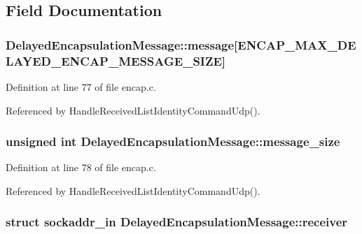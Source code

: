\subsection{\-Field \-Documentation}
\hypertarget{structDelayedEncapsulationMessage_a8a7d84611a4b658a8c27919330bb4883}{
\subsubsection[{message}]{ {\bf \-Delayed\-Encapsulation\-Message\-::message}\mbox{[}{\bf \-E\-N\-C\-A\-P\-\_\-\-M\-A\-X\-\_\-\-D\-E\-L\-A\-Y\-E\-D\-\_\-\-E\-N\-C\-A\-P\-\_\-\-M\-E\-S\-S\-A\-G\-E\-\_\-\-S\-I\-Z\-E}\mbox{]}}}\label{d4/da1/structDelayedEncapsulationMessage_a8a7d84611a4b658a8c27919330bb4883}


\-Definition at line 77 of file encap.\-c.



\-Referenced by \-Handle\-Received\-List\-Identity\-Command\-Udp().

\hypertarget{structDelayedEncapsulationMessage_ac0dba200faf880b91e7adc59d2c2cbbe}{
\subsubsection[{message\-\_\-size}]{\setlength{\rightskip}{0pt plus 5cm}unsigned int {\bf \-Delayed\-Encapsulation\-Message\-::message\-\_\-size}}}\label{d4/da1/structDelayedEncapsulationMessage_ac0dba200faf880b91e7adc59d2c2cbbe}


\-Definition at line 78 of file encap.\-c.



\-Referenced by \-Handle\-Received\-List\-Identity\-Command\-Udp().

\hypertarget{structDelayedEncapsulationMessage_a37e02e829c0cd2523010fc12da68e169}{
\subsubsection[{receiver}]{\setlength{\rightskip}{0pt plus 5cm}struct sockaddr\-\_\-in {\bf \-Delayed\-Encapsulation\-Message\-::receiver}}}\label{d4/da1/structDelayedEncapsulationMessage_a37e02e829c0cd2523010fc12da68e169}


